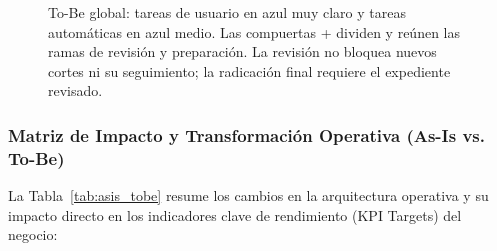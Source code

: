 \documentclass[12pt,letterpaper]{article}
\begin{document}
\begin{figure}[p]
\caption{To-Be global: tareas de usuario en azul muy claro y tareas automáticas en azul medio. Las compuertas + dividen y reúnen las ramas de revisión y preparación. La revisión no bloquea nuevos cortes ni su seguimiento; la radicación final requiere el expediente revisado.}
\label{fig:bpmn_tobe}
\end{figure}

\subsubsection{Matriz de Impacto y Transformación Operativa (As-Is vs. To-Be)}

La Tabla~\ref{tab:asis_tobe} resume los cambios en la arquitectura operativa y su impacto directo en los indicadores clave de rendimiento (KPI Targets) del negocio:
\end{document}
